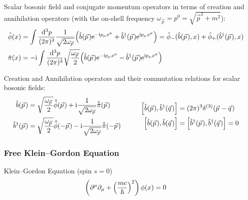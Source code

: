 			\noindent
			Scalar bosonic field and conjugate momentum operators in terms of creation and annihilation operators (with the on-shell frequency $\omega_{\vec{p}} = p^0 = \sqrt{\vec{p}^2 + m^2}$):
			\begin{equation}
				\begin{aligned}
					\hat{\phi}(x) &= \int \frac{\dd[3]{p}}{(2\pi)^3} \frac{1}{\sqrt{2 \omega_{\vec{p}}}} \qty( \hat{b}(\vec{p}) \ex^{-\i p_\mu x^\mu} + \hat{b}^\dagger(\vec{p}) \ex^{\i p_\mu x^\mu} ) = \hat{\phi}_{-}(\hat{b}(\vec{p}),x) + \hat{\phi}_{+}(\hat{b}^\dagger(\vec{p}),x) \\
					\hat{\pi}(x) &= -\i \int \frac{\dd[3]{p}}{(2\pi)^3} \sqrt{\frac{\omega_{\vec{p}}}{2}} \qty( \hat{b}(\vec{p}) \ex^{-\i p_\mu x^\mu} - \hat{b}^\dagger(\vec{p}) \ex^{\i p_\mu x^\mu} ) \\
				\end{aligned}
			\end{equation}

			\noindent
			Creation and Annihilation operators and their commutation relations for scalar bosonic fields:
			\begin{equation}
				\begin{aligned}
					\hat{b}(\vec{p}) &= \sqrt{\frac{\omega_{\vec{p}}}{2}} \hat{\tilde{\phi}}(\vec{p}) + \i \frac{1}{\sqrt{2 \omega_{\vec{p}}}} \hat{\tilde{\pi}}(\vec{p}) \\
					\hat{b}^\dagger(\vec{p}) &= \sqrt{\frac{\omega_{\vec{p}}}{2}} \hat{\tilde{\phi}}(-\vec{p}) - \i \frac{1}{\sqrt{2 \omega_{\vec{p}}}} \hat{\tilde{\pi}}(-\vec{p})
				\end{aligned}
				\hsp
				\begin{aligned}
					\comm{\hat{b}(\vec{p})}{\hat{b}^\dagger(\vec{q})} &= (2\pi)^3 \delta^{(3)}(\vec{p}-\vec{q}) \\
					\Big[ \hat{b}(\vec{p}) , \hat{b}(\vec{q}) \Big] &= \comm{\hat{b}^\dagger(\vec{p})}{\hat{b}^\dagger(\vec{q})} = 0 \\
				\end{aligned}
			\end{equation}

		\subsubsection{Free Klein--Gordon Equation}
			\noindent
			Klein--Gordon Equation (spin $s=0$)
			\begin{equation}
				\left(\partial^\mu\partial_\mu+\qty(\frac{mc}{\hbar})^2\right) \phi(x) = 0
			\end{equation}

